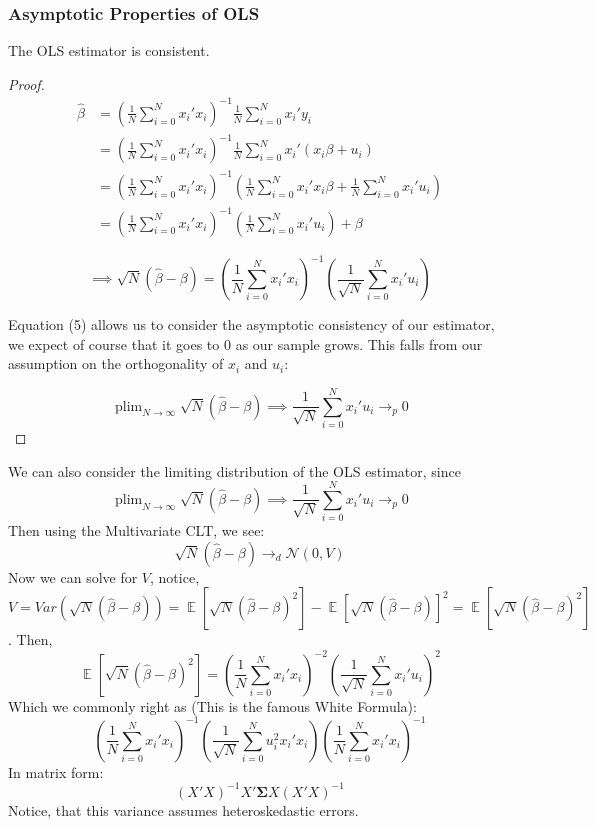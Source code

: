 \documentclass[dvips,11pt]{article}
\DeclareMathOperator{\?}{\,?\,}
\DeclareMathOperator{\E}{\mathbb{E}}
\DeclareMathOperator*{\plim}{plim}
\newenvironment{claim}[1]{\par\noindent{\bfseries Claim.}\space#1}{}
\begin{document}
\subsubsection{Asymptotic Properties of OLS}
\begin{claim} The OLS estimator is consistent.
\end{claim}
\begin{proof}
$$
\begin{aligned}
\hat\beta &= (\frac{1}{N}\sum^N_{i=0}x_i'x_i)^{-1}\frac{1}{N}\sum^N_{i=0}x_i'y_i \\
&= (\frac{1}{N}\sum^N_{i=0}x_i'x_i)^{-1}\frac{1}{N}\sum^N_{i=0}x_i'(x_i\beta+u_i) \\
&= (\frac{1}{N}\sum^N_{i=0}x_i'x_i)^{-1}(\frac{1}{N}\sum^N_{i=0}x_i'x_i\beta+\frac{1}{N}\sum^N_{i=0}x_i'u_i)\\
&= (\frac{1}{N}\sum^N_{i=0}x_i'x_i)^{-1}(\frac{1}{N}\sum^N_{i=0}x_i'u_i) + \beta
\end{aligned}
$$


\begin{equation}\implies \sqrt{N}(\hat\beta - \beta) = (\frac{1}{N}\sum^N_{i=0}x_i'x_i)^{-1}(\frac{1}{\sqrt{N}}\sum^N_{i=0}x_i'u_i)\end{equation}


Equation (5) allows us to consider the asymptotic consistency of our estimator, we expect of course that it goes to 0 as our sample grows. This falls from our assumption on the orthogonality of $x_i$ and $u_i$:

$$
\plim_{N\rightarrow\infty}\sqrt{N}(\hat\beta - \beta) \implies \frac{1}{\sqrt{N}}\sum^N_{i=0}x_i'u_i \rightarrow_p 0
$$
\end{proof}
We can also consider the limiting distribution of the OLS estimator, since
$$
\plim_{N\rightarrow\infty}\sqrt{N}(\hat\beta - \beta) \implies \frac{1}{\sqrt{N}}\sum^N_{i=0}x_i'u_i \rightarrow_p 0
$$
Then using the Multivariate CLT, we see:
$$
\sqrt{N}(\hat\beta - \beta) \rightarrow_d \mathcal{N}(0, V)
$$
Now we can solve for $V$, notice, $V = Var(\sqrt{N}(\hat\beta - \beta)) = \E[\sqrt{N}(\hat\beta - \beta)^2] - \E[\sqrt{N}(\hat\beta - \beta)]^2 = \E[\sqrt{N}(\hat\beta - \beta)^2]$. Then,
$$\E[\sqrt{N}(\hat\beta - \beta)^2] = (\frac{1}{N}\sum^N_{i=0}x_i'x_i)^{-2}(\frac{1}{\sqrt{N}}\sum^N_{i=0}x_i'u_i)^2$$
Which we commonly right as (This is the famous White Formula):
$$(\frac{1}{N}\sum^N_{i=0}x_i'x_i)^{-1}(\frac{1}{\sqrt{N}}\sum^N_{i=0}u_i^2x_i'x_i)(\frac{1}{N}\sum^N_{i=0}x_i'x_i)^{-1}$$
In matrix form: $$(X'X)^{-1}X'\boldsymbol{\Sigma} X(X'X)^{-1}$$
Notice, that this variance assumes heteroskedastic errors. 
\end{document}
